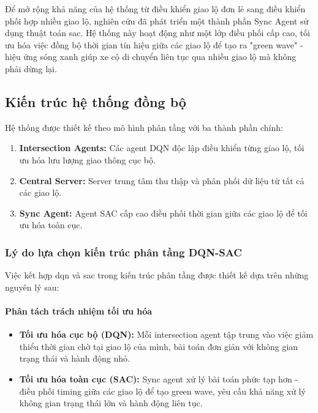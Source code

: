 Để mở rộng khả năng của hệ thống từ điều khiển giao lộ đơn lẻ sang điều khiển phối hợp nhiều giao lộ, nghiên cứu đã phát triển một thành phần Sync Agent sử dụng thuật toán \ac{sac}. Hệ thống này hoạt động như một lớp điều phối cấp cao, tối ưu hóa việc đồng bộ thời gian tín hiệu giữa các giao lộ để tạo ra "green wave" - hiệu ứng sóng xanh giúp xe cộ di chuyển liên tục qua nhiều giao lộ mà không phải dừng lại.

\subsection{Kiến trúc hệ thống đồng bộ}
Hệ thống được thiết kế theo mô hình phân tầng với ba thành phần chính:

\begin{enumerate}
    \item \textbf{Intersection Agents:} Các agent DQN độc lập điều khiển từng giao lộ, tối ưu hóa lưu lượng giao thông cục bộ.

    \item \textbf{Central Server:} Server trung tâm thu thập và phân phối dữ liệu từ tất cả các giao lộ.

    \item \textbf{Sync Agent:} Agent SAC cấp cao điều phối thời gian giữa các giao lộ để tối ưu hóa toàn cục.
\end{enumerate}

\subsubsection{Lý do lựa chọn kiến trúc phân tầng DQN-SAC}
Việc kết hợp \ac{dqn} và \ac{sac} trong kiến trúc phân tầng được thiết kế dựa trên những nguyên lý sau:

\paragraph{Phân tách trách nhiệm tối ưu hóa}
\begin{itemize}
    \item \textbf{Tối ưu hóa cục bộ (DQN):} Mỗi intersection agent tập trung vào việc giảm thiểu thời gian chờ tại giao lộ của mình, bài toán đơn giản với không gian trạng thái và hành động nhỏ.
    \item \textbf{Tối ưu hóa toàn cục (SAC):} Sync agent xử lý bài toán phức tạp hơn - điều phối timing giữa các giao lộ để tạo green wave, yêu cầu khả năng xử lý không gian trạng thái lớn và hành động liên tục.
\end{itemize}

